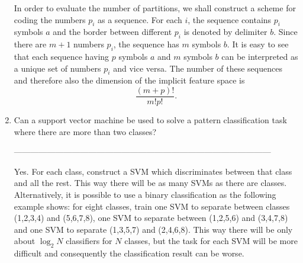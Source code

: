 \documentclass[10pt]{article}
\begin{document}
\begin{enumerate}
  In order to evaluate the number of partitions, we shall construct a
  scheme for coding the numbers $p_i$ as a sequence.  For each $i$,
  the sequence contains $p_i$ symbols $a$ and the border between
  different $p_i$ is denoted by delimiter $b$.  Since there are $m+1$
  numbers $p_i$, the sequence has $m$ symbols $b$.  It is easy to see
  that each sequence having $p$ symbols $a$ and $m$ symbols $b$ can be
  interpreted as a unique set of numbers $p_i$ and vice versa.  The
  number of these sequences and therefore also the dimension of the
  implicit feature space is 
  $$\frac{(m+p)!}{m!p!}.$$



\vspace{2mm}

\vspace{2cm}
\item Can a support vector machine be used to solve a pattern
  classification task where there are more than two classes?

---------------------------------------------------------------------------------------------

Yes.  For each class, construct a SVM which discriminates
  between that class and all the rest.  This way there will be as many
  SVMs as there are classes.  Alternatively, it is possible to use a
  binary classification as the following example shows: for eight
  classes, train one SVM to separate between classes (1,2,3,4) and
  (5,6,7,8), one SVM to separate between (1,2,5,6) and (3,4,7,8) and
  one SVM to separate (1,3,5,7) and (2,4,6,8).  This way there will be
  only about $\log_2 N$ classifiers for $N$ classes, but the task for
  each SVM will be more difficult and consequently the classification
  result can be worse.




\end{enumerate}
\end{document}
